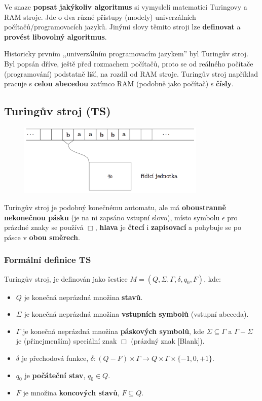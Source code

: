 Ve snaze \textbf{popsat jakýkoliv algoritmus} si vymysleli matematici Turingovy a RAM stroje. Jde o dva různé přístupy (modely) univerzálních počítačů/programovacích jazyků. Jinými slovy těmito stroji lze \textbf{definovat} a \textbf{provést} \textbf{libovolný algoritmus}.

Historicky prvním ,,univerzálním programovacím jazykem'' byl Turingův stroj. Byl popsán dříve, ještě před rozmachem počítačů, proto se od reálného počítače (programování) podstatně liší, na rozdíl od RAM stroje. Turingův stroj například pracuje s \textbf{celou abecedou} zatímco RAM (podobně jako počítač) s \textbf{čísly}.

\subsection{Turingův stroj (TS)}
\begin{figure}[H]
	\centering
	\includegraphics[width=0.8\textwidth]{assets/turing}
\end{figure}
Turingův stroj je podobný konečnému automatu, ale má \textbf{oboustranně nekonečnou pásku} (je na ni zapsáno vstupní slovo), místo symbolu $\epsilon$ pro prázdné znaky se používá $\Box$, \textbf{hlava} je \textbf{čtecí} i \textbf{zapisovací} a pohybuje se po pásce v \textbf{obou směrech}.

\subsubsection{Formální definice TS}
Turingův stroj, je definován jako šestice $M = (Q, \Sigma, \Gamma, \delta, q_0, F)$, kde:
\begin{itemize}
\item $Q$ je konečná neprázdná množina \textbf{stavů}.
\item $\Sigma$ je konečná neprázdná množina \textbf{vstupních symbolů} (vstupní abeceda).
\item $\Gamma$ je konečná neprázdná množina \textbf{páskových symbolů}, kde $\Sigma \subseteq \Gamma$ a $\Gamma - \Sigma$ je (přinejmenším) speciální znak $\Box$ (prázdný znak [Blank]).
\item $\delta$ je přechodová funkce, $\delta: (Q - F) \times \Gamma \rightarrow Q \times \Gamma \times \{-1, 0, +1\}$.
\item $q_0$ je \textbf{počáteční stav}, $q_0 \in Q$.
\item $F$ je množina \textbf{koncových stavů}, $F \subseteq Q$.
\end{itemize}

